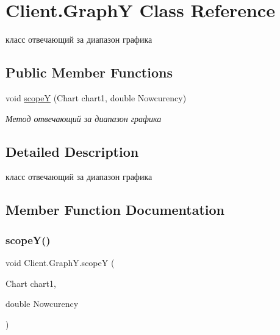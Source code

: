 \hypertarget{class_client_1_1_graph_y}{}\section{Client.\+GraphY Class Reference}
\label{class_client_1_1_graph_y}


класс отвечающий за диапазон графика  


\subsection*{Public Member Functions}
\begin{DoxyCompactItemize}
\item 
void \hyperlink{class_client_1_1_graph_y_ad6d507d05b33972eeeda5c3fe8f4354a}{scopeY} (Chart chart1, double Nowcurency)
\begin{DoxyCompactList}\small\item\em Метод отвечающий за диапазон графика \end{DoxyCompactList}\end{DoxyCompactItemize}


\subsection{Detailed Description}
класс отвечающий за диапазон графика 



\subsection{Member Function Documentation}
\hypertarget{class_client_1_1_graph_y_ad6d507d05b33972eeeda5c3fe8f4354a}{}\label{class_client_1_1_graph_y_ad6d507d05b33972eeeda5c3fe8f4354a} 
\subsubsection{\texorpdfstring{scope\+Y()}{scopeY()}}
{\footnotesize\ttfamily void Client.\+Graph\+Y.\+scopeY (\begin{DoxyParamCaption}\item[{Chart}]{chart1,  }\item[{double}]{Nowcurency }\end{DoxyParamCaption})\hspace{0.3cm}{\ttfamily [inline]}}



